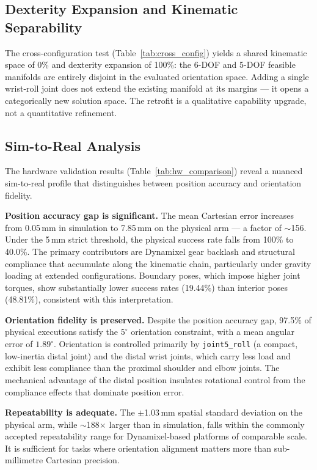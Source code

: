 \documentclass[conference]{IEEEtran}
\begin{document}
	\subsection{Dexterity Expansion and Kinematic Separability}
	
	The cross-configuration test (Table~\ref{tab:cross_config}) yields a
	shared kinematic space of 0\% and dexterity expansion of 100\%: the
	6-DOF and 5-DOF feasible manifolds are entirely disjoint in the
	evaluated orientation space. Adding a single wrist-roll joint does not
	extend the existing manifold at its margins --- it opens a
	categorically new solution space. The retrofit is a qualitative
	capability upgrade, not a quantitative refinement.
	
	\subsection{Sim-to-Real Analysis}
	\label{sec:sim_to_real}
	
	The hardware validation results (Table~\ref{tab:hw_comparison}) reveal
	a nuanced sim-to-real profile that distinguishes between position
	accuracy and orientation fidelity.
	
	\textbf{Position accuracy gap is significant.}
	The mean Cartesian error increases from 0.05\,mm in simulation to
	7.85\,mm on the physical arm --- a factor of $\sim$156. Under the
	5\,mm strict threshold, the physical success rate falls from 100\% to
	40.0\%. The primary contributors are Dynamixel gear backlash and
	structural compliance that accumulate along the kinematic chain,
	particularly under gravity loading at extended configurations.
	Boundary poses, which impose higher joint torques, show substantially
	lower success rates (19.44\%) than interior poses (48.81\%),
	consistent with this interpretation.
	
	\textbf{Orientation fidelity is preserved.}
	Despite the position accuracy gap, 97.5\% of physical executions
	satisfy the $5^\circ$ orientation constraint, with a mean angular
	error of $1.89^\circ$. Orientation is controlled primarily by
	\texttt{joint5\_roll} (a compact, low-inertia distal joint) and the
	distal wrist joints, which carry less load and exhibit less compliance
	than the proximal shoulder and elbow joints. The mechanical advantage
	of the distal position insulates rotational control from the compliance
	effects that dominate position error.
	
	\textbf{Repeatability is adequate.}
	The $\pm$1.03\,mm spatial standard deviation on the physical arm,
	while $\sim$188$\times$ larger than in simulation, falls within the
	commonly accepted repeatability range for Dynamixel-based platforms of
	comparable scale. It is sufficient for tasks where orientation
	alignment matters more than sub-millimetre Cartesian precision.
	
\end{document}
